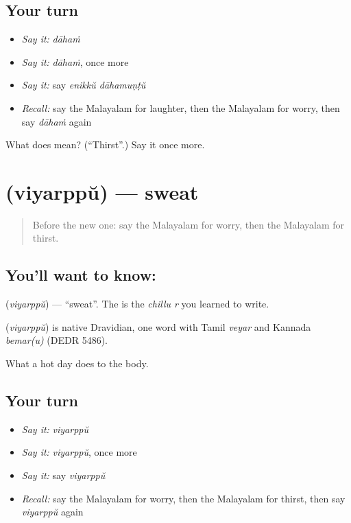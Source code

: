 \subsection*{Your turn}
\begin{itemize}
\raggedright
  \item \emph{Say it:} \emph{dāhaṁ}
  \item \emph{Say it:} \emph{dāhaṁ}, once more
  \item \emph{Say it:} say \emph{enikkŭ dāhamuṇṭŭ}
  \item \emph{Recall:} say the Malayalam for laughter, then the Malayalam for worry, then say \emph{dāhaṁ} again
\end{itemize}

\begin{tcolorbox}[breakable,colback=teal!4,colframe=teal!35!black,title={Before you move on}]
What does  mean? (\textquotedblleft{}Thirst\textquotedblright{}.) Say it once more.
\end{tcolorbox}
\section[\texorpdfstring{\ml{വിയർപ്പ്} (viyarppŭ)}{വിയർപ്പ് (viyarppŭ)}]{ (viyarppŭ) — sweat}

\label{lesson:ML-C117-sweat}



\begin{quote}
Before the new one: say the Malayalam for worry, then the Malayalam for thirst.
\end{quote}

\subsection*{You'll want to know: }
\textbf{} (\emph{viyarppŭ}) — \textquotedblleft{}sweat\textquotedblright{}. The \textbf{} is the \emph{chillu r} you learned to write.

\begin{cousinweb}
\textbf{} (\emph{viyarppŭ}) is native Dravidian, one word with Tamil \emph{veyar} and Kannada \emph{bemar(u)} (DEDR 5486).
\end{cousinweb}

\begin{grammarlens}[title={What you've built}]
What a hot day does to the body.
\end{grammarlens}

\subsection*{Your turn}
\begin{itemize}
\raggedright
  \item \emph{Say it:} \emph{viyarppŭ}
  \item \emph{Say it:} \emph{viyarppŭ}, once more
  \item \emph{Say it:} say \emph{viyarppŭ}
  \item \emph{Recall:} say the Malayalam for worry, then the Malayalam for thirst, then say \emph{viyarppŭ} again
\end{itemize}


